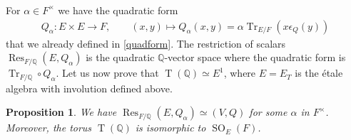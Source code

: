 \documentclass[11pt]{article} %
\newcommand{\8}{\infty}
\newcommand{\Tbf}{\operatorname{T}}
\newcommand{\SO}{\operatorname{SO}}
\newcommand{\Q}{\mathbb{Q}}
\newcommand{\Tr}{\operatorname{Tr}}
\newcommand{\Res}{\operatorname{Res}}
\theoremstyle{mytheoremstyle}
\newtheorem{prop}[thm]{Proposition}
\theoremstyle{remark}
\numberwithin{equation}{section}
\begin{document}
\subsubsection{} For $\alpha \in F^\times$ we have the quadratic form
\begin{align}
    Q_\alpha \colon E \times E \longrightarrow F, \qquad
    (x,y) \longmapsto Q_\alpha(x,y)=\alpha \Tr_{E/F}( x \epsilon_Q(y))
\end{align}
that we already defined in \eqref{quadform}. The restriction of scalars $\Res_{F/\Q} (E,Q_\alpha)$ is the quadratic $\Q$-vector space where the quadratic form is $\Tr_{F /\Q} \circ Q_\alpha$. Let us now prove that $\Tbf(\Q) \simeq E^1$, where $E=E_T$ is the \'etale algebra with involution defined above.
\begin{prop} \label{restr}
    We have $\Res_{F/\Q} (E,Q_\alpha) \simeq (V,Q) $ for some $\alpha$ in $F^\times$. Moreover, the torus $\Tbf(\Q)$ is isomorphic to $\SO_{E}(F)$.
\end{prop} 
\end{document}
